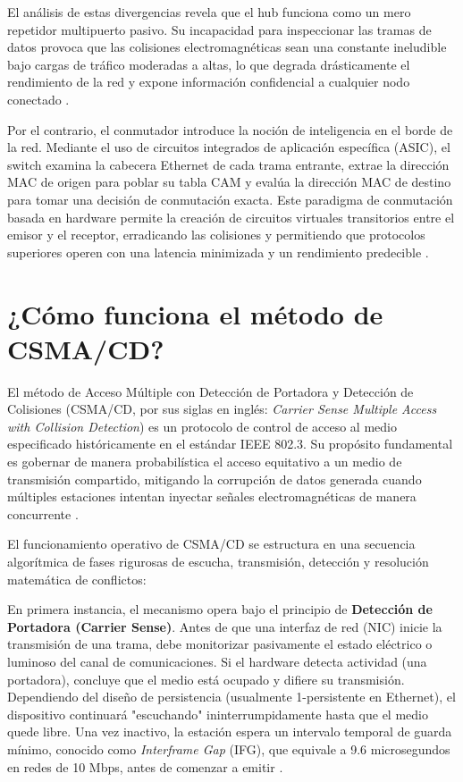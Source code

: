 \documentclass[a4paper,12pt]{article}
\begin{document}
El análisis de estas divergencias revela que el hub funciona como un mero repetidor multipuerto pasivo. Su incapacidad para inspeccionar las tramas de datos provoca que las colisiones electromagnéticas sean una constante ineludible bajo cargas de tráfico moderadas a altas, lo que degrada drásticamente el rendimiento de la red y expone información confidencial a cualquier nodo conectado \cite{stallings2014}. 

Por el contrario, el conmutador introduce la noción de inteligencia en el borde de la red. Mediante el uso de circuitos integrados de aplicación específica (ASIC), el switch examina la cabecera Ethernet de cada trama entrante, extrae la dirección MAC de origen para poblar su tabla CAM y evalúa la dirección MAC de destino para tomar una decisión de conmutación exacta. Este paradigma de conmutación basada en hardware permite la creación de circuitos virtuales transitorios entre el emisor y el receptor, erradicando las colisiones y permitiendo que protocolos superiores operen con una latencia minimizada y un rendimiento predecible \cite{kurose2017}.


\section{¿Cómo funciona el método de CSMA/CD?}

El método de Acceso Múltiple con Detección de Portadora y Detección de Colisiones (CSMA/CD, por sus siglas en inglés: \textit{Carrier Sense Multiple Access with Collision Detection}) es un protocolo de control de acceso al medio especificado históricamente en el estándar IEEE 802.3. Su propósito fundamental es gobernar de manera probabilística el acceso equitativo a un medio de transmisión compartido, mitigando la corrupción de datos generada cuando múltiples estaciones intentan inyectar señales electromagnéticas de manera concurrente \cite{ieee8023}.

El funcionamiento operativo de CSMA/CD se estructura en una secuencia algorítmica de fases rigurosas de escucha, transmisión, detección y resolución matemática de conflictos:

En primera instancia, el mecanismo opera bajo el principio de \textbf{Detección de Portadora (Carrier Sense)}. Antes de que una interfaz de red (NIC) inicie la transmisión de una trama, debe monitorizar pasivamente el estado eléctrico o luminoso del canal de comunicaciones. Si el hardware detecta actividad (una portadora), concluye que el medio está ocupado y difiere su transmisión. Dependiendo del diseño de persistencia (usualmente 1-persistente en Ethernet), el dispositivo continuará "escuchando" ininterrumpidamente hasta que el medio quede libre. Una vez inactivo, la estación espera un intervalo temporal de guarda mínimo, conocido como \textit{Interframe Gap} (IFG), que equivale a 9.6 microsegundos en redes de 10 Mbps, antes de comenzar a emitir \cite{tanenbaum2021}.
\end{document}
